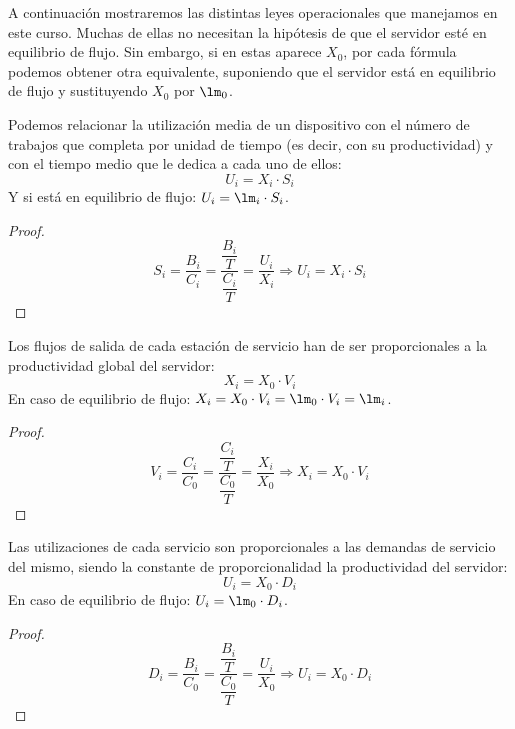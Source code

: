 A continuación mostraremos las distintas leyes operacionales que manejamos en este curso. Muchas de ellas no necesitan la hipótesis de que el servidor esté en equilibrio de flujo. Sin embargo, si en estas aparece $X_0$, por cada fórmula podemos obtener otra equivalente, suponiendo que el servidor está en equilibrio de flujo y sustituyendo $X_0$ por $\lm_0$.

\begin{prop}
    Podemos relacionar la utilización media de un dispositivo con el número de trabajos que completa por unidad de tiempo (es decir, con su productividad) y con el tiempo medio que le dedica a cada uno de ellos:
    \begin{equation*}
        U_i = X_i \cdot S_i
    \end{equation*}
    Y si está en equilibrio de flujo: $U_i = \lm_i \cdot S_i$.
    \begin{proof}
        \begin{equation*}
            S_i = \dfrac{B_i}{C_i} = \dfrac{\dfrac{B_i}{T}}{\dfrac{C_i}{T}} = \dfrac{U_i}{X_i} \Longrightarrow U_i = X_i\cdot S_i
        \end{equation*}
    \end{proof}
\end{prop}

\begin{prop}
    Los flujos de salida de cada estación de servicio han de ser proporcionales a la productividad global del servidor:
    \begin{equation*}
        X_i = X_0\cdot V_i
    \end{equation*}
    En caso de equilibrio de flujo: $X_i = X_0 \cdot V_i = \lm_0\cdot V_i = \lm_i$.
    \begin{proof}
        \begin{equation*}
            V_i = \dfrac{C_i}{C_0} = \dfrac{\dfrac{C_i}{T}}{\dfrac{C_0}{T}} = \dfrac{X_i}{X_0} \Longrightarrow X_i = X_0\cdot V_i
        \end{equation*}
    \end{proof}
\end{prop}

\begin{prop}
    Las utilizaciones de cada servicio son proporcionales a las demandas de servicio del mismo, siendo la constante de proporcionalidad la productividad del servidor:
    \begin{equation*}
        U_i = X_0 \cdot D_i
    \end{equation*}
    En caso de equilibrio de flujo: $U_i = \lm_0 \cdot D_i$.
    \begin{proof}
        \begin{equation*}
            D_i = \dfrac{B_i}{C_0} = \dfrac{\dfrac{B_i}{T}}{\dfrac{C_0}{T}} = \dfrac{U_i}{X_0} \Longrightarrow U_i = X_0\cdot D_i
        \end{equation*}
    \end{proof}
\end{prop}


